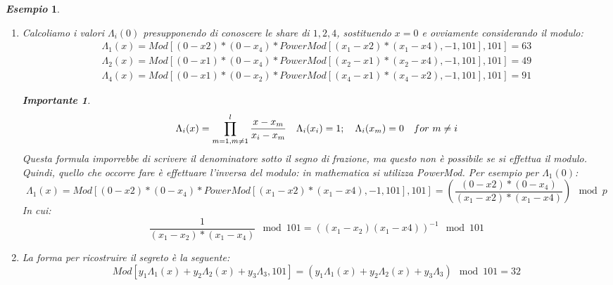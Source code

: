 \documentclass{book}
\newtheorem*{Importante}{\textbf{Importante}}
\newtheorem{esempio}{\emph{Esempio}}
\begin{document}
\begin{esempio}
\begin{enumerate}
        \item Calcoliamo i valori \(\Lambda_{i}(0) \) presupponendo di conoscere le share di \(1,2,4\), sostituendo \(x=0\) e ovviamente considerando il modulo:
              \begin{equation*}
                  \begin{matrix}
                      \Lambda_{1}(x)= Mod[(0-x{2})*(0-x_{4})*PowerMod[(x_{1}-x{2})*(x_{1}-x{4}),-1,101],101]=63 \\
                      \Lambda_{2}(x)= Mod[(0-x{1})*(0-x_{4})*PowerMod[(x_{2}-x{1})*(x_{2}-x{4}),-1,101],101]=49 \\
                      \Lambda_{4}(x)= Mod[(0-x{1})*(0-x_{2})*PowerMod[(x_{4}-x{1})*(x_{4}-x{2}),-1,101],101]=91
                  \end{matrix}
              \end{equation*}
              \begin{Importante}
                  \begin{equation*}
                      \centering
                      \Lambda_{i}(x)=\prod_{m=1,m\neq1}^{l}{\frac{x-x_{m}}{x_{i}-x_{m}}}\quad \Lambda_{i}(x_{i})=1;\quad \Lambda_{i}(x_{m})=0\quad for\ m\neq i
                  \end{equation*}
                  Questa formula imporrebbe di scrivere il denominatore sotto il segno di frazione, ma questo non è possibile se si effettua il modulo\@. Quindi, quello che occorre fare è effettuare l'inversa del modulo: in mathematica si utilizza PowerMod. Per esempio per \(\Lambda_{1}(0)\):
                  \begin{equation*}
                      \Lambda_{1}(x)= Mod[(0-x{2})*(0-x_{4})*PowerMod[(x_{1}-x{2})*(x_{1}-x{4}),-1,101],101]=(\frac{(0-x{2})*(0-x_{4})}{(x_{1}-x{2})*(x_{1}-x{4})})\mod{p}
                  \end{equation*}
                  In cui:
                  \begin{equation*}
                      \frac{1}{(x_{1}-x_{2})*(x_{1}-x_{4})}\mod{101}=
                      {((x_{1}-x_{2})(x_{1}-x{4}))}^{-1}\mod{101}
                  \end{equation*}
              \end{Importante}
        \item La forma per ricostruire il segreto è la seguente:
              \begin{equation*}
                  Mod[y_{1}\Lambda_{1}(x)+y_{2}\Lambda_{2}(x)+y_{3}\Lambda_{3},101]=(y_{1}\Lambda_{1}(x)+y_{2}\Lambda_{2}(x)+y_{3}\Lambda_{3})\mod{101}=32

\end{equation*}
\end{enumerate}
\end{esempio}
\end{document}
